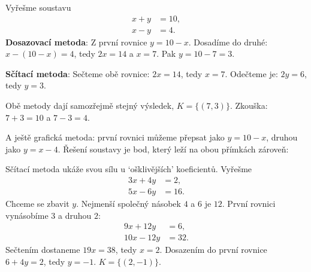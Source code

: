 \begin{example}
  Vyřešme soustavu
  \begin{align*}
    x + y &= 10,\\
    x - y &= 4.
  \end{align*}
  \textbf{Dosazovací metoda}: Z první rovnice $y = 10 - x$. Dosadíme do druhé: $x - (10 - x) = 4$, tedy $2x = 14$ a $x = 7$. Pak $y = 10 - 7 = 3$.

  \textbf{Sčítací metoda}: Sečteme obě rovnice: $2x = 14$, tedy $x = 7$. Odečteme je: $2y = 6$, tedy $y = 3$.

  Obě metody dají samozřejmě stejný výsledek, $K = \{(7, 3)\}$. Zkouška: $7 + 3 = 10$ a $7 - 3 = 4$.

  A ještě grafická metoda: první rovnici můžeme přepsat jako $y = 10 - x$, druhou jako $y = x - 4$. Řešení soustavy je bod, který leží na obou přímkách zároveň:
  \begin{center}
  \end{center}
\end{example}

\begin{example}
  Sčítací metoda ukáže svou sílu u `ošklivějších' koeficientů. Vyřešme
  \begin{align*}
    3x + 4y &= 2,\\
    5x - 6y &= 16.
  \end{align*}
  Chceme se zbavit $y$. Nejmenší společný násobek $4$ a $6$ je $12$. První rovnici vynásobíme $3$ a druhou $2$:
  \begin{align*}
    9x + 12y &= 6,\\
    10x - 12y &= 32.
  \end{align*}
  Sečtením dostaneme $19x = 38$, tedy $x = 2$. Dosazením do první rovnice $6 + 4y = 2$, tedy $y = -1$. $K = \{(2, -1)\}$.
\end{example}

